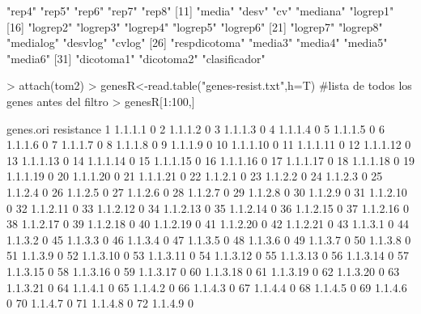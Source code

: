 \documentclass[12pt]{article}
\begin{document}
\begin{Schunk}
\begin{Soutput}
 [6] "rep4"         "rep5"         "rep6"         "rep7"         "rep8"        
[11] "media"        "desv"         "cv"           "mediana"      "logrep1"     
[16] "logrep2"      "logrep3"      "logrep4"      "logrep5"      "logrep6"     
[21] "logrep7"      "logrep8"      "medialog"     "desvlog"      "cvlog"       
[26] "respdicotoma" "media3"       "media4"       "media5"       "media6"      
[31] "dicotoma1"    "dicotoma2"    "clasificador"
\end{Soutput}
\begin{Sinput}
> attach(tom2)
> genesR<-read.table("genes-resist.txt",h=T) #lista de todos los genes antes del filtro
> genesR[1:100,]
\end{Sinput}
\begin{Soutput}
    genes.ori resistance
1     1.1.1.1          0
2     1.1.1.2          0
3     1.1.1.3          0
4     1.1.1.4          0
5     1.1.1.5          0
6     1.1.1.6          0
7     1.1.1.7          0
8     1.1.1.8          0
9     1.1.1.9          0
10   1.1.1.10          0
11   1.1.1.11          0
12   1.1.1.12          0
13   1.1.1.13          0
14   1.1.1.14          0
15   1.1.1.15          0
16   1.1.1.16          0
17   1.1.1.17          0
18   1.1.1.18          0
19   1.1.1.19          0
20   1.1.1.20          0
21   1.1.1.21          0
22    1.1.2.1          0
23    1.1.2.2          0
24    1.1.2.3          0
25    1.1.2.4          0
26    1.1.2.5          0
27    1.1.2.6          0
28    1.1.2.7          0
29    1.1.2.8          0
30    1.1.2.9          0
31   1.1.2.10          0
32   1.1.2.11          0
33   1.1.2.12          0
34   1.1.2.13          0
35   1.1.2.14          0
36   1.1.2.15          0
37   1.1.2.16          0
38   1.1.2.17          0
39   1.1.2.18          0
40   1.1.2.19          0
41   1.1.2.20          0
42   1.1.2.21          0
43    1.1.3.1          0
44    1.1.3.2          0
45    1.1.3.3          0
46    1.1.3.4          0
47    1.1.3.5          0
48    1.1.3.6          0
49    1.1.3.7          0
50    1.1.3.8          0
51    1.1.3.9          0
52   1.1.3.10          0
53   1.1.3.11          0
54   1.1.3.12          0
55   1.1.3.13          0
56   1.1.3.14          0
57   1.1.3.15          0
58   1.1.3.16          0
59   1.1.3.17          0
60   1.1.3.18          0
61   1.1.3.19          0
62   1.1.3.20          0
63   1.1.3.21          0
64    1.1.4.1          0
65    1.1.4.2          0
66    1.1.4.3          0
67    1.1.4.4          0
68    1.1.4.5          0
69    1.1.4.6          0
70    1.1.4.7          0
71    1.1.4.8          0
72    1.1.4.9          0

\end{Soutput}
\end{Schunk}
\end{document}
